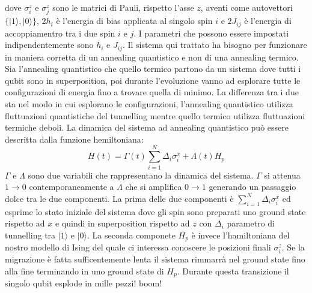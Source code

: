 dove $\sigma_i^z$ e $\sigma_j^z$ sono le matrici di Pauli, rispetto l'asse $z$, aventi come autovettori $\{|1\rangle, |0\rangle\}$, $2h_i$ è l'energia di bias applicata al singolo spin $i$ e $2J_{ij}$ è l'energia di accoppiamentro tra i due spin $i$ e $j$. I parametri che possono essere impostati indipendentemente sono $h_i$ e $J_{ij}$.
Il sistema qui trattato ha bisogno per funzionare in maniera corretta di un annealing quantistico e non di una annealing termico.
Sia l'annealing quantistico che quello termico partono da un sistema dove tutti i qubit sono in superposition, poi durante l'evoluzione vanno ad esplorare tutte le configurazioni di energia fino a trovare quella di minimo. La differenza tra i due sta nel modo in cui esplorano le configurazioni, l'annealing quantistico utilizza fluttuazioni quantistiche del tunnelling mentre quello termico utilizza fluttuazioni termiche deboli. La dinamica del sistema ad annealing quantistico può essere descritta dalla funzione hemiltoniana:
$$H(t) = \Gamma(t) \sum_{i=1}^N \Delta_i \sigma_i^x + \Lambda(t) H_p$$
$\Gamma$ e $\Lambda$ sono due variabili che rappresentano la dinamica del sistema. $\Gamma$ si attenua $1 \to 0$ contemporaneamente a $\Lambda$ che si amplifica $0 \to 1$ generando un passaggio dolce tra le due componenti. La prima delle due componenti è $\sum_{i=1}^N \Delta_i \sigma_i^x$ ed esprime lo stato iniziale del sistema dove gli spin sono preparati uno ground state rispetto ad $x$ e quindi in superposition rispetto ad $z$ con $\Delta_i$ parametro di tunnelling tra $|1\rangle$ e $|0\rangle$. La seconda componete $H_p$ è invece l'hamiltoniana del nostro modello di Ising del quale ci interessa conoscere le posizioni finali $\sigma_i^z$.
Se la migrazione è fatta sufficentemente lenta il sistema rimmarrà nel ground state fino alla fine terminando in uno ground state di $H_p$.
Durante questa transizione il singolo qubit esplode in mille pezzi! boom!
